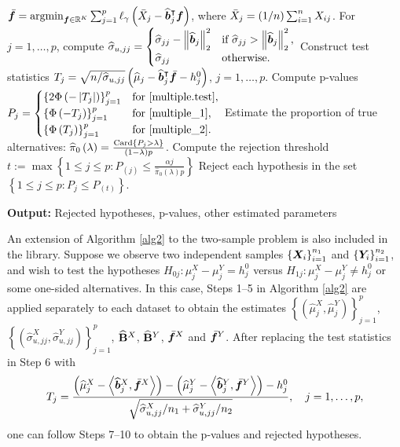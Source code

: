 \begin{algorithm}[!t]
\begin{algorithmic}[1]
\begin{itemize}
\end{itemize}
\STATE $\bar{\bff}=\argmin_{ \bff \in \RR^K } \sum_{j=1} ^p\ell_{\gamma}\left( \bar X_{j}    -    \hat{\bb}_j^\T{\bff} \right) $, where $ \bar X_{j}    = \left(1/n\right)\sn X_{ij}$.
\STATE For $j = 1, \ldots, p$, compute
$ \hat{\sigma}_{u,jj} =
  \begin{cases} \hat{\sigma}_{jj}-\left\|\hat{\bb}_j\right\|_2^2 & \text{if }  \hat{\sigma}_{jj} >\left\|\hat{\bb}_j\right\|_2^2 , \\
   \hat{\sigma}_{jj}        & \text{otherwise} .
   \end{cases}$
\STATE Construct test statistics $T_j= \sqrt{n/\hat{\sigma}_{u, jj} } \left(\hat{\mu}_{j}-\hat{\bb}_j^\T\bar{\bff}-h^0_j\right)$, $j=1,\ldots, p$.
\STATE Compute p-values $P_j= \begin{cases}
 \left\{2\Phi\left(-\left|T_j\right|\right) \right\}_{j=1}^p & \text{for \eqref{multiple.test}}, \\
  \left\{\Phi\left(-T_j\right) \right\}_{j=1}^p&\text{for \eqref{multiple_1}}, \\
  \left\{\Phi\left(T_j\right) \right\}_{j=1}^p& \text{for \eqref{multiple_2}}.
    \end{cases}$
\STATE Estimate the proportion of true alternatives: $\hat \pi_0\left(\lambda\right)=\frac{{\rm Card}\left\{P_j > \lambda\right\}}{\left(1-\lambda\right)p}$.
\STATE   Compute the rejection threshold $t:=\max \left\{  1 \leq j \leq p : P_{\left(j\right)}\leq \frac{\alpha j}{\hat \pi_0\left(\lambda\right) p}\right\}$
\STATE Reject each hypothesis in the set $\left\{ 1\leq j \leq p :  P_j \leq P_{\left(t\right)}\right\}$.
\end{algorithmic}
 \hspace*{\algorithmicindent} \hspace{-0.6cm} \textbf{Output:} Rejected hypotheses, p-values, other estimated parameters
\end{algorithm}

An extension of Algorithm \ref{alg2} to the two-sample problem is also included in the library. Suppose we observe two independent samples  $\left\{ \bX_i  \right\}_{i=1}^{n_1}$  and  $\left\{ \bY_i \right\}_{i=1}^{n_2}$, and wish to test the hypotheses $H_{0j}:  \mu_j^X-\mu_j^Y =h_j^0$ versus $H_{1j}: \mu_j^X-\mu_j^Y \neq h_j^0$ or some one-sided alternatives. In this case, Steps 1--5 in Algorithm \ref{alg2} are applied separately to each dataset to obtain the estimates $\left\{\left(\hat{\mu}^X_j, \hat{\mu}^Y_j\right)\right\}_{j=1}^p$, $\left\{\left(\hat{\sigma}^{X}_{u, jj}  , \hat{\sigma}^{Y}_{u, jj}\right) \right\}_{j=1}^p$, $\hat{\Bb}^X$, $\hat{\Bb}^Y$, $\bar{\bff}^X$ and $\bar{\bff}^Y$. After replacing the test statistics in Step 6 with
$$
	T_j=  \frac{   \left(\hat{\mu}^X_{j}-  \left\langle \hat{\bb}_j^X , \bar{\bff}^X \right\rangle \right) -\left(\hat{\mu}^Y_{j}- \left\langle \hat{\bb}_j^Y , \bar{\bff}^Y \right\rangle \right) -h^0_j   }{ \sqrt{ \hat{\sigma}^{ X}_{u, jj} / n_1  + \hat{\sigma}^{Y}_{u, jj} /n_2  } } ,  \quad j=1,\ldots, p,
$$
one can follow Steps 7--10 to obtain the p-values and rejected hypotheses.



